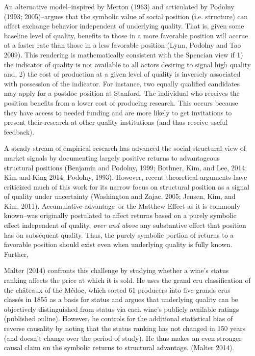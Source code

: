 An alternative model--inspired by Merton (1963) and articulated by Podolny (1993; 2005)--argues that the symbolic value of social position (i.e. structure) can affect exchange behavior independent of underlying quality. That is, given some baseline level of quality, benefits to those in a more favorable position will accrue at a faster rate than those in a less favorable position (Lynn, Podolny and Tao 2009). This rendering is mathematically consistent with the Spencian view if 1) the indicator of quality is not available to all actors desiring to signal high quality and, 2) the cost of production at a given level of quality is inversely associated with possession of the indicator. For instance, two equally qualified candidates may apply for a postdoc position at Stanford. The individual who receives the position benefits from a lower cost of producing research. This occurs because they have access to needed funding and are more likely to get invitations to present their research at other quality institutions (and thus receive useful feedback).

A steady stream of empirical research has advanced the social-structural view of market signals by documenting largely positive returns to advantageous structural positions (Benjamin and Podolny, 1999; Bothner, Kim, and Lee, 2014; Kim and King 2014; Podolny, 1993). However, recent theoretical arguments have criticized much of this work for its narrow focus on structural position as a signal of quality under uncertainty (Washington and Zajac, 2005; Jensen, Kim, and Kim, 2011). Accumulative advantage--or the Matthew Effect as it is commonly known--was originally postulated to affect returns based on a purely symbolic effect independent of quality, {\it over and above} any substantive effect that position has on subsequent quality. Thus, the purely symbolic portion of returns to a favorable position should exist even when underlying quality is fully known. Further, 

Malter (2014) confronts this challenge by studying whether a wine's status ranking affects the price at which it is sold. He uses the grand cru classification of the ch\^ateaux of the M\'edoc, which sorted 61 producers into five grands crus class\'es in 1855 as a basis for status and argues that underlying quality can be objectively distinguished from status via each wine's publicly available ratings (published online). However, he controls for the additional statistical bias of reverse causality by noting that the status ranking has not changed in 150 years (and doesn't change over the period of study). He thus makes an even stronger causal claim on the symbolic returns to structural advantage. (Malter 2014). 


